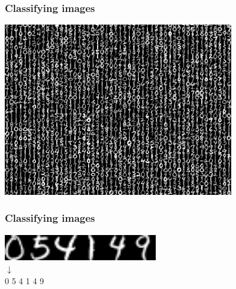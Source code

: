 \begin{frame}
  \frametitle{Classifying images}

  \begin{center}
  \includegraphics[width=0.75\textwidth]{../../code/image_data/sample_digits.png}
  \end{center}

\end{frame}


\begin{frame}
  \frametitle{Classifying images}

  \begin{center}
    \includegraphics[width=0.5\textwidth]{ocr.png} \\
  \Huge{$\downarrow$} \\
  \Huge{0 \hskip10pt 5 \hskip10pt 4 \hskip10pt 1 \hskip10pt 4 \hskip10pt 9}
  \end{center}

\end{frame}
